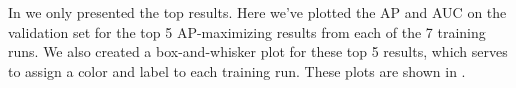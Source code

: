 \begin{comment}
import kwutil
print(round(kwutil.timedelta.coerce('07:52:02').to_pint().to('hours'), 2))
print(round(kwutil.timedelta.coerce('00:13:29').to_pint().to('hours'), 2))
print(round(kwutil.timedelta.coerce('04:23:34').to_pint().to('hours'), 2))
print(round(kwutil.timedelta.coerce('00:07:32').to_pint().to('hours'), 2))

print(round(kwutil.timedelta.coerce(kwutil.timedelta.coerce('4 days') + kwutil.timedelta.coerce('14:18:23')).to_pint().to('days'), 2))
print(round(kwutil.timedelta.coerce(kwutil.timedelta.coerce('6 days') + kwutil.timedelta.coerce('06:52:11')).to_pint().to('days'), 2))
print(round(kwutil.timedelta.coerce('00:20:07').to_pint().to('hours'), 2))
print(round(kwutil.timedelta.coerce('00:27:31').to_pint().to('hours'), 2))

# Prediction kwh/days ratio
(4.39 / 3.17)

# Prediction kwh/carbon ratio
85.31/17.95
3.17 / 0.67

# training kwh/days ratio
(39.22 * 24) / 324.75
1_316.07 / 276.37
324.75 / 68.20
\end{comment}


In  we only presented the top results.
Here we've plotted the AP and AUC on the validation set for the top 5 AP-maximizing results from each of the
  7 training runs.
We also created a box-and-whisker plot for these top 5 results, which serves to assign a color and label to
  each training run.
These plots are shown in .



